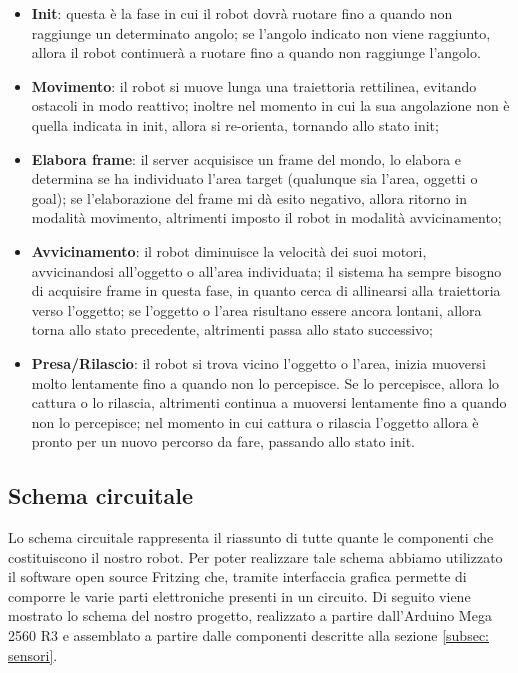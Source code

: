 \documentclass[a4paper,12pt,italian]{article}
\begin{document}
\begin{itemize}
	\item \textbf{Init}: questa è la fase in cui il robot dovrà ruotare fino a quando non raggiunge un determinato angolo; se l'angolo indicato non viene raggiunto, allora il robot continuerà a ruotare fino a quando non raggiunge l'angolo.
	\item \textbf{Movimento}: il robot si muove lunga una traiettoria rettilinea, evitando ostacoli in modo reattivo; inoltre nel momento in cui la sua angolazione non è quella indicata in init, allora si re-orienta, tornando allo stato init;
	\item \textbf{Elabora frame}: il server acquisisce un frame del mondo, lo elabora e determina se ha individuato l'area target (qualunque sia l'area, oggetti o goal); se l'elaborazione del frame mi dà esito negativo, allora ritorno in modalità movimento, altrimenti imposto il robot in modalità avvicinamento;
	\item \textbf{Avvicinamento}: il robot diminuisce la velocità dei suoi motori, avvicinandosi all'oggetto o all'area individuata; il sistema ha sempre bisogno di acquisire frame in questa fase, in quanto cerca di allinearsi alla traiettoria verso l'oggetto; se l'oggetto o l'area risultano essere ancora lontani, allora torna allo stato precedente, altrimenti passa allo stato successivo;
	\item \textbf{Presa/Rilascio}: il robot si trova vicino l'oggetto o l'area, inizia muoversi molto lentamente fino a quando non lo percepisce. Se lo percepisce, allora lo cattura o lo rilascia, altrimenti continua a muoversi lentamente fino a quando non lo percepisce; nel momento in cui cattura o rilascia l'oggetto allora è pronto per un nuovo percorso da fare, passando allo stato init.
\end{itemize}

\subsection{Schema circuitale}
Lo schema circuitale rappresenta il riassunto di tutte quante le componenti che costituiscono il nostro robot. Per poter realizzare tale schema abbiamo utilizzato il software open source Fritzing che, tramite interfaccia grafica permette di comporre le varie parti elettroniche presenti in un circuito. Di seguito viene mostrato lo schema del nostro progetto, realizzato a partire dall’Arduino Mega 2560 R3 e assemblato a partire dalle componenti descritte alla sezione \ref{subsec: sensori}.
\end{document}
